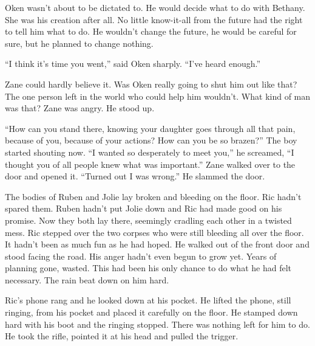 Oken wasn't about to be dictated to.  He would decide what to do with Bethany.  She was his creation after all.  No little know-it-all from the future had the right to tell him what to do.  He wouldn't change the future, he would be careful for sure, but he planned to change nothing.

``I think it's time you went,'' said Oken sharply.  ``I've heard enough.''

Zane could hardly believe it.  Was Oken really going to shut him out like that?  The one person left in the world who could help him wouldn't.  What kind of man was that?  Zane was angry.  He stood up.  

``How can you stand there, knowing your daughter goes through all that pain, because of you, because of your actions?  How can you be so brazen?''  The boy started shouting now.  ``I wanted so desperately to meet you,'' he screamed, ``I thought you of all people knew what was important.''  Zane walked over to the door and opened it.  ``Turned out I was wrong.''  He slammed the door.



\thoughtbreak



The bodies of Ruben and Jolie lay broken and bleeding on the floor.  Ric hadn't spared them.  Ruben hadn't put Jolie down and Ric had made good on his promise.  Now they both lay there, seemingly cradling each other in a twisted mess.  Ric stepped over the two corpses who were still bleeding all over the floor.  It hadn't been as much fun as he had hoped.  He walked out of the front door and stood facing the road.  His anger hadn't even begun to grow yet.  Years of planning gone, wasted.  This had been his only chance to do what he had felt necessary.  The rain beat down on him hard.

Ric's phone rang and he looked down at his pocket.  He lifted the phone, still ringing, from his pocket and placed it carefully on the floor.  He stamped down hard with his boot and the ringing stopped.  There was nothing left for him to do.  He took the rifle, pointed it at his head and pulled the trigger.



